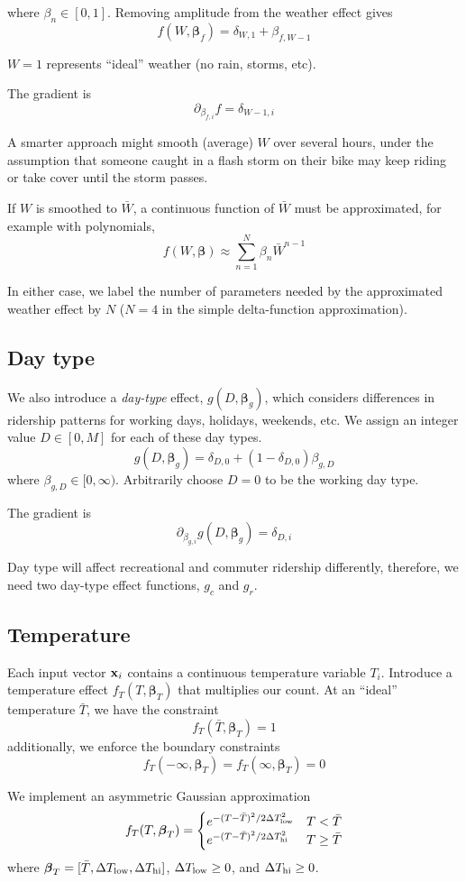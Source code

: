 \documentclass{article}
\newcommand{\bx}{{\bf x}}
\newcommand{\bbeta}{\boldsymbol\beta}
\begin{document}
where $\beta_n \in [0, 1]$.
Removing amplitude from the weather effect gives
\[
f(W, \bbeta_f) = \delta_{W,1} + \beta_{f,W-1}
\]

$W=1$ represents ``ideal''
weather (no rain, storms, etc).

The gradient is
\[
\partial_{\beta_{f,i}} f = \delta_{W-1,i}
\]


A smarter approach might smooth (average) $W$ 
over several hours, under the assumption that someone caught in a
flash storm on their bike may keep riding or take cover until the
storm passes.

If $W$ is smoothed to $\bar{W}$, a continuous function of $\bar{W}$
must be approximated, for example with polynomials,
\[
f(W, \bbeta) \approx \sum_{n=1}^N \beta_n \bar{W}^{n-1}
\]

In either case, we label the number of parameters needed by the
approximated weather effect by $N$ ($N=4$ in the simple delta-function
approximation).

\subsection*{Day type}

We also introduce a {\it day-type} effect, $g(D, \bbeta_g)$, which
considers differences in ridership patterns for working days,
holidays, weekends, etc. We assign an integer value $D \in [0, M]$ for each of these
day types.
\[
g(D, \bbeta_g) = \delta_{D,0} + (1 - \delta_{D,0}) \beta_{g,D}
\]
where $\beta_{g,D} \in [0, \infty)$. Arbitrarily choose $D = 0$ to be the
working day type.

The gradient is
\[
\partial_{\beta_{g,i}} g(D, \bbeta_g) = \delta_{D,i}
\]

Day type will affect recreational and commuter ridership differently,
therefore, we need two day-type effect functions, $g_c$ and $g_r$.

\subsection*{Temperature}

Each input vector $\bx_i$ contains a continuous temperature variable
$T_i$.
Introduce a temperature effect $f_T(T, \bbeta_T)$
that multiplies our count. At an
``ideal'' temperature $\bar{T}$, we have the constraint
\[
f_T(\bar{T}, \bbeta_T) = 1
\]
additionally, we enforce the boundary constraints
\[
f_T(-\infty, \bbeta_T) = f_T(\infty, \bbeta_T) = 0
\]

We implement an asymmetric Gaussian approximation
\[
f_T(T, \bbeta_T) =
\begin{cases}
  e^{-(T - \bar{T})^2 / 2 \Delta T_{\rm low}^2} & T < \bar{T} \\
  e^{-(T - \bar{T})^2 / 2 \Delta T_{\rm hi}^2} & T \geq \bar{T}
\end{cases}
\]
where $\bbeta_T = [\bar{T}, \Delta T_{\rm low}, \Delta T_{\rm hi}]$,
$\Delta T_{\rm low} \geq 0$, and
$\Delta T_{\rm hi} \geq 0$.
\end{document}
